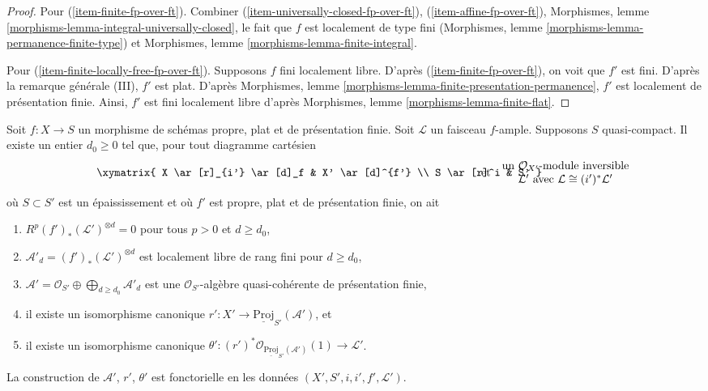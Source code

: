 \begin{proof}
\medskip\noindent
Pour (\ref{item-finite-fp-over-ft}).
Combiner (\ref{item-universally-closed-fp-over-ft}),
(\ref{item-affine-fp-over-ft}),
Morphismes, lemme \ref{morphisms-lemma-integral-universally-closed},
le fait que $f$ est localement de type fini
(Morphismes, lemme \ref{morphisms-lemma-permanence-finite-type}) et
Morphismes, lemme \ref{morphisms-lemma-finite-integral}.

\medskip\noindent
Pour (\ref{item-finite-locally-free-fp-over-ft}).
Supposons $f$ fini localement libre. D'après
(\ref{item-finite-fp-over-ft}), on voit que $f'$ est fini.
D'après la remarque générale (III), $f'$ est plat.
D'après Morphismes, lemme \ref{morphisms-lemma-finite-presentation-permanence},
$f'$ est localement de présentation finie. Ainsi, $f'$ est fini localement libre d'après
Morphismes, lemme \ref{morphisms-lemma-finite-flat}.
\end{proof}


\begin{lemma}
\label{lemma-deform-projective}
Soit $f : X \to S$ un morphisme de schémas propre, plat et
de présentation finie. Soit $\mathcal{L}$ un faisceau $f$-ample. Supposons
$S$ quasi-compact. Il existe un entier $d_0 \geq 0$ tel que,
pour tout diagramme cartésien
$$
\vcenter{
\xymatrix{
X \ar[r]_{i'} \ar[d]_f & X' \ar[d]^{f'} \\
S \ar[r]^i & S'
}
}
\quad\text{et}\quad
\begin{matrix}
\text{un }\mathcal{O}_{X'}\text{-module inversible}\\
\mathcal{L}'\text{ avec }\mathcal{L} \cong (i')^*\mathcal{L}'
\end{matrix}
$$
où $S \subset S'$ est un épaississement et où $f'$ est
propre, plat et de présentation finie, on ait
\begin{enumerate}
\item $R^p(f')_*(\mathcal{L}')^{\otimes d} = 0$
pour tous $p > 0$ et $d \geq d_0$,
\item $\mathcal{A}'_d = (f')_*(\mathcal{L}')^{\otimes d}$
est localement libre de rang fini pour $d \geq d_0$,
\item $\mathcal{A}' =
\mathcal{O}_{S'} \oplus \bigoplus_{d \geq d_0} \mathcal{A}'_d$
est une $\mathcal{O}_{S'}$-algèbre quasi-cohérente de présentation finie,
\item il existe un isomorphisme canonique
$r' : X' \to \underline{\text{Proj}}_{S'}(\mathcal{A}')$, et
\item il existe un isomorphisme canonique
$\theta' : (r')^*\mathcal{O}_{\underline{\text{Proj}}_{S'}(\mathcal{A}')}(1)
\to \mathcal{L}'$.
\end{enumerate}
La construction de $\mathcal{A}'$, $r'$, $\theta'$
est fonctorielle en les données $(X', S', i, i', f', \mathcal{L}')$.
\end{lemma}

